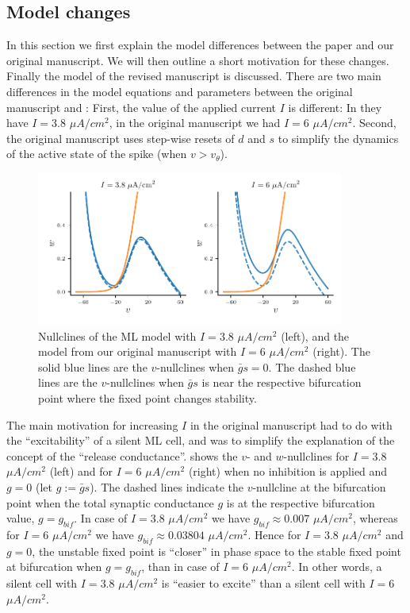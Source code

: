 \documentclass[utf8]{article}
\newcounter{point}[section]
\begin{document}
\subsection{Model changes}
\label{sec:model}
In this section we first explain the model differences between the \cite{bose2011} paper and our original manuscript.
We will then outline a short motivation for these changes.
Finally the model of the revised manuscript is discussed.
There are two main differences in the model equations and parameters between the original manuscript and \cite{bose2011}:
First, the value of the applied current $I$ is different: In \cite{bose2011} they have $I=3.8$ $\si{\mu A/cm^2}$, in the original manuscript we had $I=6$ $\si{\mu A/cm^2}$.
Second, the original manuscript uses step-wise resets of $d$ and $s$ to simplify the dynamics of the active state of the spike (when $v > v_{\theta}$).

\begin{figure}[h!]
	\centering
	\includegraphics[width=0.9\textwidth]{model-changes}
	\caption{Nullclines of the \cite{bose2011} ML model with $I=3.8$ $\si{\mu A/cm^2}$ (left), and the model from our original manuscript with $I=6$ $\si{\mu A/cm^2}$ (right). The solid blue lines are the $v$-nullclines when $\bar g s=0$. The dashed blue lines are the $v$-nullclines when $\bar g s$ is near the respective bifurcation point where the fixed point changes stability.\label{fig:nullclines}}
\end{figure}

The main motivation for increasing $I$ in the original manuscript had to do with the ``excitability'' of a silent ML cell, and was to simplify the explanation of the concept of the ``release conductance''.
 shows the $v$- and $w$-nullclines for $I=3.8$ $\si{\mu A/cm^2}$ (left) and for $I=6$ $\si{\mu A/cm^2}$ (right) when no inhibition is applied and $g = 0$ (let $g:= \bar g s$).
The dashed lines indicate the $v$-nullcline at the bifurcation point when the total synaptic conductance $g$ is at the respective bifurcation value, $g=g_{bif}$.
In case of $I=3.8$ $\si{\mu A/cm^2}$ we have $g_{bif}\approx 0.007$ $\si{\mu A/cm^2}$, whereas for $I=6$ $\si{\mu A/cm^2}$ we have $g_{bif}\approx 0.03804$ $\si{\mu A/cm^2}$.
Hence for $I=3.8$ $\si{\mu A/cm^2}$ and $g=0$, the unstable fixed point is ``closer'' in phase space to the stable fixed point at bifurcation when $g=g_{bif}$, than in case of $I=6$ $\si{\mu A/cm^2}$.
In other words, a silent cell with $I=3.8$ $\si{\mu A/cm^2}$ is ``easier to excite'' than a silent cell with $I=6$ $\si{\mu A/cm^2}$.
\end{document}
